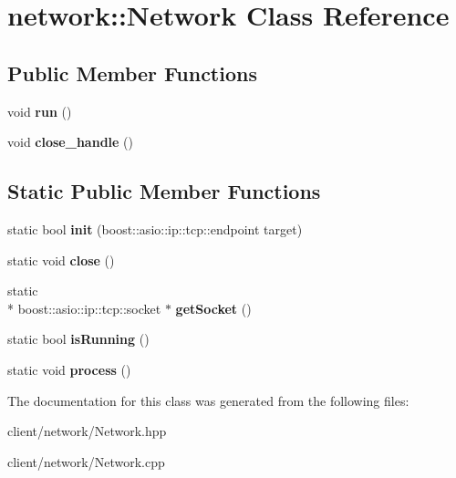 \hypertarget{classnetwork_1_1_network}{\section{network\-:\-:Network Class Reference}
\label{classnetwork_1_1_network}
}
\subsection*{Public Member Functions}
\begin{DoxyCompactItemize}
\item 
\hypertarget{classnetwork_1_1_network_ae6e852ff5440d8f9a440a4e0c4339110}{void {\bfseries run} ()}\label{classnetwork_1_1_network_ae6e852ff5440d8f9a440a4e0c4339110}

\item 
\hypertarget{classnetwork_1_1_network_ae4d7f463ce7a19d12f38dc0622c412d6}{void {\bfseries close\-\_\-handle} ()}\label{classnetwork_1_1_network_ae4d7f463ce7a19d12f38dc0622c412d6}

\end{DoxyCompactItemize}
\subsection*{Static Public Member Functions}
\begin{DoxyCompactItemize}
\item 
\hypertarget{classnetwork_1_1_network_aa941784c503bc71ba3e01e255e7dfa61}{static bool {\bfseries init} (boost\-::asio\-::ip\-::tcp\-::endpoint target)}\label{classnetwork_1_1_network_aa941784c503bc71ba3e01e255e7dfa61}

\item 
\hypertarget{classnetwork_1_1_network_a0eb37332aae9c6d6b81bd413a4e0c008}{static void {\bfseries close} ()}\label{classnetwork_1_1_network_a0eb37332aae9c6d6b81bd413a4e0c008}

\item 
\hypertarget{classnetwork_1_1_network_a890b6a4b7677770fea60966b10a42364}{static \\*
boost\-::asio\-::ip\-::tcp\-::socket $\ast$ {\bfseries get\-Socket} ()}\label{classnetwork_1_1_network_a890b6a4b7677770fea60966b10a42364}

\item 
\hypertarget{classnetwork_1_1_network_ac4ca0af2002f4503f9f61bd3a79322e0}{static bool {\bfseries is\-Running} ()}\label{classnetwork_1_1_network_ac4ca0af2002f4503f9f61bd3a79322e0}

\item 
\hypertarget{classnetwork_1_1_network_aa693330323ff387697a4912312723bb6}{static void {\bfseries process} ()}\label{classnetwork_1_1_network_aa693330323ff387697a4912312723bb6}

\end{DoxyCompactItemize}


The documentation for this class was generated from the following files\-:\begin{DoxyCompactItemize}
\item 
client/network/Network.\-hpp\item 
client/network/Network.\-cpp\end{DoxyCompactItemize}
